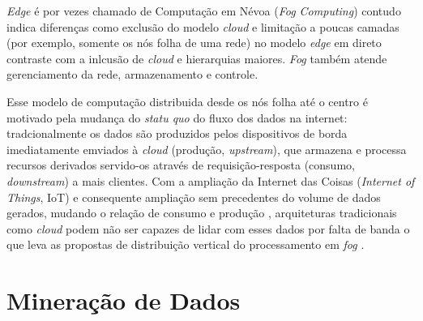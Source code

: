 \emph{Edge} é por vezes chamado de Computação em Névoa (\emph{Fog Computing})
contudo  indica diferenças como exclusão do
modelo \emph{cloud} e limitação a poucas camadas (por exemplo, somente os nós folha de uma rede)
no modelo \emph{edge} em direto contraste com a inlcusão de \emph{cloud} e hierarquias
maiores. \emph{Fog} também atende gerenciamento da rede, armazenamento e controle.


Esse modelo de computação distribuida desde os nós folha até o centro é motivado
pela mudança do \emph{statu quo} do fluxo dos dados na internet: tradcionalmente
os dados são produzidos pelos dispositivos de borda imediatamente emviados à 
\emph{cloud} (produção, \emph{upstream}),
que armazena e processa recursos derivados servido-os através de requisição-resposta
(consumo, \emph{downstream}) a mais clientes.
Com a ampliação da Internet das Coisas (\emph{Internet of Things}, IoT) e consequente
ampliação sem precedentes do volume de dados gerados, mudando o relação de consumo
e produção \cite{Shi2016}, arquiteturas tradicionais como \emph{cloud} podem não
ser capazes de lidar com esses dados por falta de banda o que leva as
propostas de distribuição vertical do processamento em \emph{fog} \cite{Bonomi2012, Dastjerdi2016}.



\section{Mineração de Dados}
